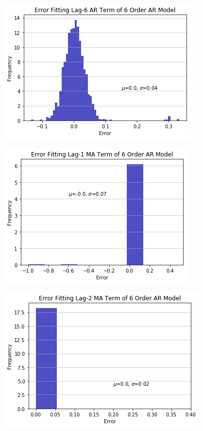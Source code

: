 \documentclass[oneside,12pt,openany]{book}
\begin{document}
	\begin{figure}[!ht]
		\centering
		\includegraphics[width=.85\linewidth]{images/ARModelARLag6CoefDist.png}
	\end{figure}
	\begin{figure}[!ht]
		\centering
		\includegraphics[width=.85\linewidth]{images/ARModelMALag1CoefDist.png}
	\end{figure}
	
	\begin{figure}[!ht]
		\centering
		\includegraphics[width=.85\linewidth]{images/ARModelMALag2CoefDist.png}
	\end{figure}
\end{document}
